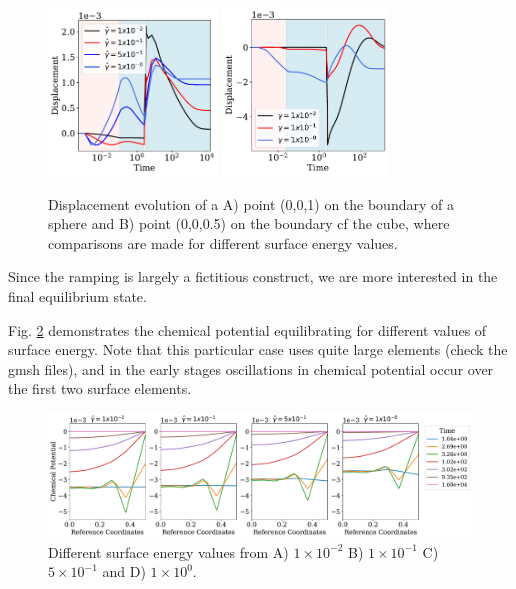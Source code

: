 \documentclass[12pt,3p]{article}
\numberwithin{equation}{section}
\begin{document}
\begin{figure}[!htb]
\centering
\includegraphics[width=0.4\textwidth]{./Images/SphereDispEvoGv}
\includegraphics[width=0.39\textwidth]{./Images/CubeFreeDispEvoGv}
\caption{Displacement evolution of a A) point (0,0,1) on the boundary of a sphere and B) point (0,0,0.5) on the boundary cf the cube, where comparisons are made for different surface energy values. }
\label{FigDispEvo}
\end{figure}
Since the ramping is largely a fictitious construct, we are more interested in the final equilibrium state. 

\newpage 

Fig. \ref{FigSphereChemEvo} demonstrates the chemical potential equilibrating for different values of surface energy. Note that this particular case uses quite large elements (check the gmsh files), and in the early stages oscillations in chemical potential occur over the first two surface elements. 

\begin{figure}[!htb]
\centering
\includegraphics[width=\textwidth]{./Images/SphereChemEvoGv}
\caption{Different surface energy values from A) $1 \times 10^{-2}$ B) $1 \times 10^{-1}$ C) $5 \times 10^{-1}$ and D) $1 \times 10^{0}$. }
\label{FigSphereChemEvo}
\end{figure}
\end{document}
